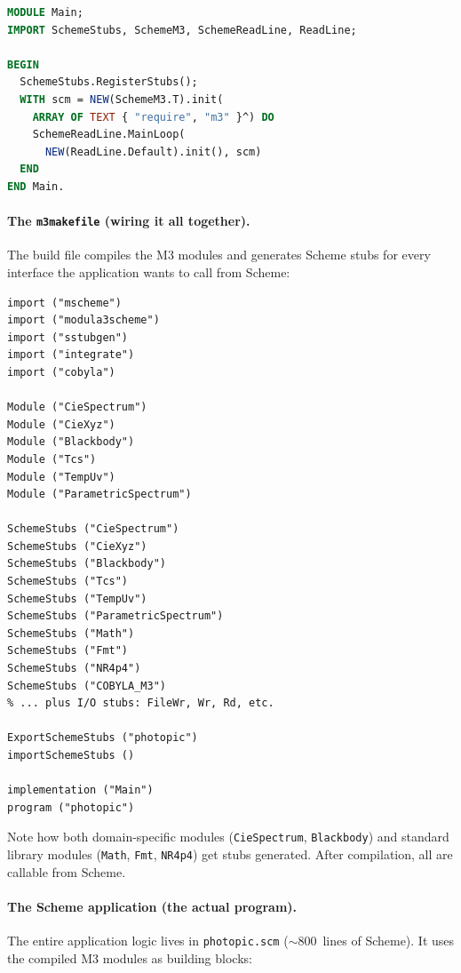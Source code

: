 \documentclass[12pt]{report}
\begin{document}
\begin{lstlisting}[language=Modula3]
MODULE Main;
IMPORT SchemeStubs, SchemeM3, SchemeReadLine, ReadLine;

BEGIN
  SchemeStubs.RegisterStubs();
  WITH scm = NEW(SchemeM3.T).init(
    ARRAY OF TEXT { "require", "m3" }^) DO
    SchemeReadLine.MainLoop(
      NEW(ReadLine.Default).init(), scm)
  END
END Main.
\end{lstlisting}

\paragraph{The {\tt m3makefile} (wiring it all together).}
The build file compiles the M3 modules and generates Scheme stubs
for every interface the application wants to call from Scheme:

\begin{lstlisting}[language={}]
import ("mscheme")
import ("modula3scheme")
import ("sstubgen")
import ("integrate")
import ("cobyla")

Module ("CieSpectrum")
Module ("CieXyz")
Module ("Blackbody")
Module ("Tcs")
Module ("TempUv")
Module ("ParametricSpectrum")

SchemeStubs ("CieSpectrum")
SchemeStubs ("CieXyz")
SchemeStubs ("Blackbody")
SchemeStubs ("Tcs")
SchemeStubs ("TempUv")
SchemeStubs ("ParametricSpectrum")
SchemeStubs ("Math")
SchemeStubs ("Fmt")
SchemeStubs ("NR4p4")
SchemeStubs ("COBYLA_M3")
% ... plus I/O stubs: FileWr, Wr, Rd, etc.

ExportSchemeStubs ("photopic")
importSchemeStubs ()

implementation ("Main")
program ("photopic")
\end{lstlisting}

\noindent Note how both domain-specific modules ({\tt CieSpectrum},
{\tt Blackbody}) and standard library modules ({\tt Math}, {\tt Fmt},
{\tt NR4p4}) get stubs generated.  After compilation, all are callable
from Scheme.

\paragraph{The Scheme application (the actual program).}
The entire application logic lives in {\tt photopic.scm}
($\sim$800~lines of Scheme).  It uses the compiled M3 modules as
building blocks:
\end{document}
